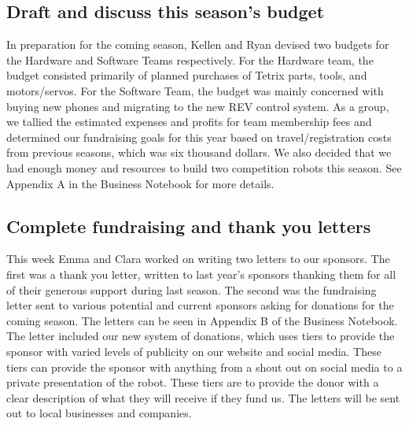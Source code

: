 \documentclass{article}
\begin{document}
\subsection{Draft and discuss this season's budget}
In preparation for the coming season, Kellen and Ryan devised two budgets for the Hardware and Software Teams respectively. For the Hardware team, the budget consisted primarily of planned purchases of Tetrix parts, tools, and motors/servos. For the Software Team, the budget was mainly concerned with buying new phones and migrating to the new REV control system. As a group, we tallied the estimated expenses and profits for team membership fees and determined our fundraising goals for this year based on travel/registration costs from previous seasons, which was six thousand dollars. We also decided that we had enough money and resources to build two competition robots this season. See Appendix A in the Business Notebook for more details.

\subsection{Complete fundraising and thank you letters}
This week Emma and Clara worked on writing two letters to our sponsors.  The first was a thank you letter, written to last year's sponsors thanking them for all of their generous support during last season. The second was the fundraising letter sent to various potential and current sponsors asking for donations for the coming season. The letters can be seen in Appendix B of the Business Notebook. The letter included our new system of donations, which uses tiers to provide the sponsor with varied levels of publicity on our website and social media. These tiers can provide the sponsor with anything from a shout out on social media to a private presentation of the robot.  These tiers are to provide the donor with a clear description of what they will receive if they fund us. The letters will be sent out to local businesses and companies. 
\end{document}
